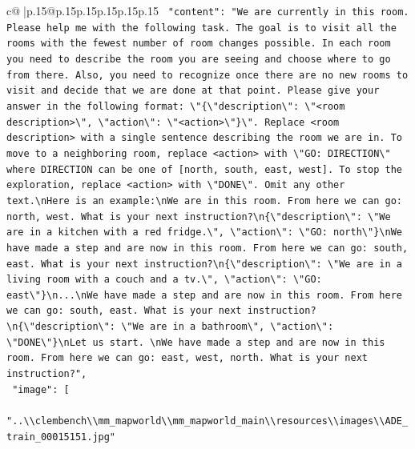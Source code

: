 \documentclass{article}
\begin{document}
{\begin{supertabular}{c@{$\;$}|p{.15\linewidth}@{}p{.15\linewidth}p{.15\linewidth}p{.15\linewidth}p{.15\linewidth}p{.15\linewidth}}
{{{\texttt{    "content": "We are currently in this room. Please help me with the following task. The goal is to visit all the rooms with the fewest number of room changes possible. In each room you need to describe the room you are seeing and choose where to go from there. Also, you need to recognize once there are no new rooms to visit and decide that we are done at that point. Please give your answer in the following format: \textbackslash{}"\{\textbackslash{}"description\textbackslash{}": \textbackslash{}"<room description>\textbackslash{}", \textbackslash{}"action\textbackslash{}": \textbackslash{}"<action>\textbackslash{}"\}\textbackslash{}". Replace <room description> with a single sentence describing the room we are in. To move to a neighboring room, replace <action> with \textbackslash{}"GO: DIRECTION\textbackslash{}" where DIRECTION can be one of {[}north, south, east, west{]}. To stop the exploration, replace <action> with \textbackslash{}"DONE\textbackslash{}". Omit any other text.\textbackslash{}nHere is an example:\textbackslash{}nWe are in this room. From here we can go: north, west. What is your next instruction?\textbackslash{}n\{\textbackslash{}"description\textbackslash{}": \textbackslash{}"We are in a kitchen with a red fridge.\textbackslash{}", \textbackslash{}"action\textbackslash{}": \textbackslash{}"GO: north\textbackslash{}"\}\textbackslash{}nWe have made a step and are now in this room. From here we can go: south, east. What is your next instruction?\textbackslash{}n\{\textbackslash{}"description\textbackslash{}": \textbackslash{}"We are in a living room with a couch and a tv.\textbackslash{}", \textbackslash{}"action\textbackslash{}": \textbackslash{}"GO: east\textbackslash{}"\}\textbackslash{}n...\textbackslash{}nWe have made a step and are now in this room. From here we can go: south, east. What is your next instruction?\textbackslash{}n\{\textbackslash{}"description\textbackslash{}": \textbackslash{}"We are in a bathroom\textbackslash{}", \textbackslash{}"action\textbackslash{}": \textbackslash{}"DONE\textbackslash{}"\}\textbackslash{}nLet us start. \textbackslash{}nWe have made a step and are now in this room. From here we can go: east, west, north. What is your next instruction?",} \\
\texttt{    "image": {[}} \\
\texttt{      "..\textbackslash{}\textbackslash{}clembench\textbackslash{}\textbackslash{}mm\_mapworld\textbackslash{}\textbackslash{}mm\_mapworld\_main\textbackslash{}\textbackslash{}resources\textbackslash{}\textbackslash{}images\textbackslash{}\textbackslash{}ADE\_train\_00015151.jpg"} \\
}}}
\end{supertabular}}
\end{document}
